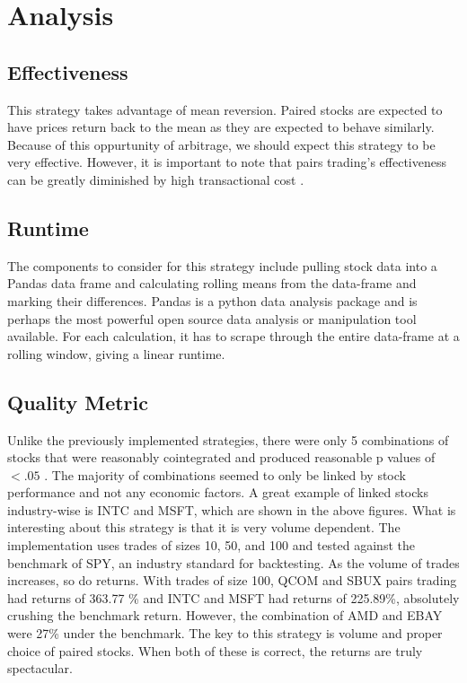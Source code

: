 \documentclass[letterpaper,11pt]{article}
\begin{document}
\section*{Analysis}

\subsection*{Effectiveness}
This strategy takes advantage of mean reversion. Paired stocks are expected to have prices return back to the mean as they are expected to behave similarly. Because of this oppurtunity of arbitrage, we should expect this strategy to be very effective. However, it is important to note that pairs trading's effectiveness can be greatly diminished by high transactional cost \cite{Gatev2006}.

\subsection*{Runtime}
The components to consider for this strategy include pulling stock data into a Pandas data frame and calculating rolling means from the data-frame and marking their differences. Pandas is a python data analysis package and is perhaps the most powerful open source data analysis or manipulation tool available. For each calculation, it has to scrape through the entire data-frame at a rolling window, giving a linear runtime.

\subsection*{Quality Metric}
Unlike the previously implemented strategies, there were only 5 combinations of stocks that were reasonably cointegrated and produced reasonable p values of $< .05$ . The majority of combinations seemed to only be linked by stock performance and not any economic factors. A great example of linked stocks industry-wise is INTC and MSFT, which are shown in the above figures. What is interesting about this strategy is that it is very volume dependent. The implementation uses trades of sizes 10, 50, and 100 and tested against the benchmark of SPY, an industry standard for backtesting. As the volume of trades increases, so do returns. With trades of size 100, QCOM and SBUX pairs trading had returns of 363.77 \% and INTC and MSFT had returns of 225.89\%, absolutely crushing the benchmark return. However, the combination of AMD and EBAY were 27\% under the benchmark. The key to this strategy is volume and proper choice of paired stocks. When both of these is correct, the returns are truly spectacular.
\end{document}
